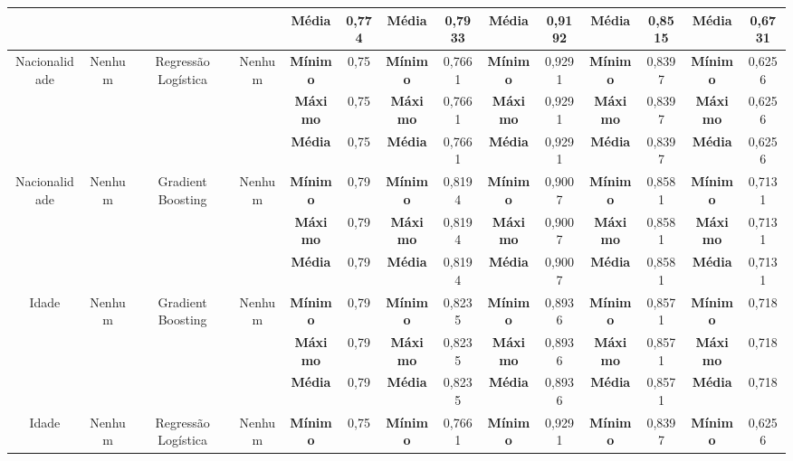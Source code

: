 \documentclass[Portugues,Final]{ic-tese-v3}
\begin{document}
\begin{table}[H]
\begin{center}
{\begin{tabular}{c|c|c|c|c|c|c|c|c|c|c|c|c|c}
             & & & & \textbf{Média} & 0,774 & \textbf{Média} & 0,7933 & \textbf{Média} & 0,9192 & \textbf{Média} & 0,8515 & \textbf{Média} & 0,6731 \\
            \hline
            \multirow{3}{*}{Nacionalidade} & \multirow{3}{*}{Nenhum} & \multirow{3}{*}{Regressão Logística} & \multirow{3}{*}{Nenhum} & \textbf{Mínimo} & 0,75 & \textbf{Mínimo} & 0,7661 & \textbf{Mínimo} & 0,9291 & \textbf{Mínimo} & 0,8397 & \textbf{Mínimo} & 0,6256 \\
             & & & & \textbf{Máximo} & 0,75 & \textbf{Máximo} & 0,7661 & \textbf{Máximo} & 0,9291 & \textbf{Máximo} & 0,8397 & \textbf{Máximo} & 0,6256 \\
             & & & & \textbf{Média} & 0,75 & \textbf{Média} & 0,7661 & \textbf{Média} & 0,9291 & \textbf{Média} & 0,8397 & \textbf{Média} & 0,6256 \\
            \hline
            \multirow{3}{*}{Nacionalidade} & \multirow{3}{*}{Nenhum} & \multirow{3}{*}{Gradient Boosting} & \multirow{3}{*}{Nenhum} & \textbf{Mínimo} & 0,79 & \textbf{Mínimo} & 0,8194 & \textbf{Mínimo} & 0,9007 & \textbf{Mínimo} & 0,8581 & \textbf{Mínimo} & 0,7131 \\
             & & & & \textbf{Máximo} & 0,79 & \textbf{Máximo} & 0,8194 & \textbf{Máximo} & 0,9007 & \textbf{Máximo} & 0,8581 & \textbf{Máximo} & 0,7131 \\
             & & & & \textbf{Média} & 0,79 & \textbf{Média} & 0,8194 & \textbf{Média} & 0,9007 & \textbf{Média} & 0,8581 & \textbf{Média} & 0,7131 \\
            \hline
            \multirow{3}{*}{Idade} & \multirow{3}{*}{Nenhum} & \multirow{3}{*}{Gradient Boosting} & \multirow{3}{*}{Nenhum} & \textbf{Mínimo} & 0,79 & \textbf{Mínimo} & 0,8235 & \textbf{Mínimo} & 0,8936 & \textbf{Mínimo} & 0,8571 & \textbf{Mínimo} & 0,718 \\
             & & & & \textbf{Máximo} & 0,79 & \textbf{Máximo} & 0,8235 & \textbf{Máximo} & 0,8936 & \textbf{Máximo} & 0,8571 & \textbf{Máximo} & 0,718 \\
             & & & & \textbf{Média} & 0,79 & \textbf{Média} & 0,8235 & \textbf{Média} & 0,8936 & \textbf{Média} & 0,8571 & \textbf{Média} & 0,718 \\
            \hline
            \multirow{3}{*}{Idade} & \multirow{3}{*}{Nenhum} & \multirow{3}{*}{Regressão Logística} & \multirow{3}{*}{Nenhum} & \textbf{Mínimo} & 0,75 & \textbf{Mínimo} & 0,7661 & \textbf{Mínimo} & 0,9291 & \textbf{Mínimo} & 0,8397 & \textbf{Mínimo} & 0,6256 \\

\end{tabular}}
\end{center}
\end{table}
\end{document}
